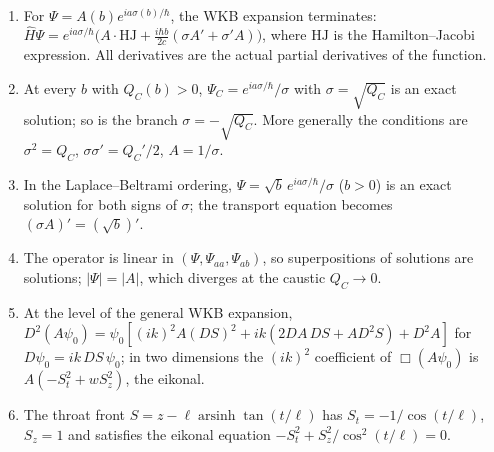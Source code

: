 \begin{theorem}\label{thm:wdwexact}\ver\
\begin{enumerate}[label=(\roman*)]
\item For $\Psi=A(b)e^{ia\sigma(b)/\hbar}$, the WKB expansion terminates: $\hat H\Psi=e^{ia\sigma/\hbar}\bigl(A\cdot\mathrm{HJ}+\frac{i\hbar b}{2c}(\sigma A'+\sigma'A)\bigr)$, where $\mathrm{HJ}$ is the Hamilton--Jacobi expression. All derivatives are the actual partial derivatives of the function.
\item At every $b$ with $Q_C(b)>0$, $\Psi_C=e^{ia\sigma/\hbar}/\sigma$ with $\sigma=\sqrt{Q_C}$ is an exact solution; so is the branch $\sigma=-\sqrt{Q_C}$. More generally the conditions are $\sigma^2=Q_C$, $\sigma\sigma'=Q_C'/2$, $A=1/\sigma$.
\item In the Laplace--Beltrami ordering, $\Psi=\sqrt b\,e^{ia\sigma/\hbar}/\sigma$ ($b>0$) is an exact solution for both signs of $\sigma$; the transport equation becomes $(\sigma A)'=(\sqrt b)'$.
\item The operator is linear in $(\Psi,\Psi_{aa},\Psi_{ab})$, so superpositions of solutions are solutions; $|\Psi|=|A|$, which diverges at the caustic $Q_C\to0$.
\item At the level of the general WKB expansion, $D^2(A\psi_0)=\psi_0[(ik)^2A(DS)^2+ik(2DA\,DS+AD^2S)+D^2A]$ for $D\psi_0=ik\,DS\,\psi_0$; in two dimensions the $(ik)^2$ coefficient of $\Box(A\psi_0)$ is $A(-S_t^2+wS_z^2)$, the eikonal.
\item The throat front $S=z-\ell\operatorname{arsinh}\tan(t/\ell)$ has $S_t=-1/\cos(t/\ell)$, $S_z=1$ and satisfies the eikonal equation $-S_t^2+S_z^2/\cos^2(t/\ell)=0$.
\end{enumerate}
\end{theorem}
